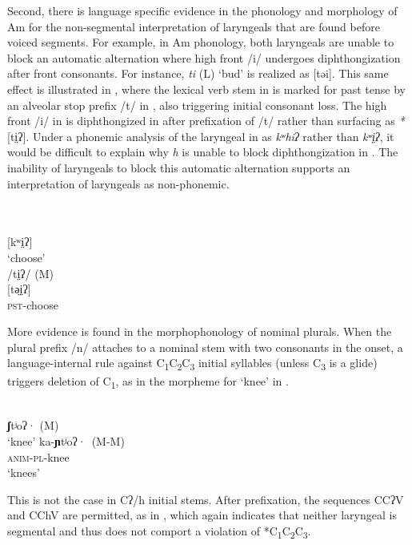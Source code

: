 \documentclass[output=paper]{langscibook}
\begin{document}
Second, there is language specific evidence in the phonology and morphology of Am for the non-segmental interpretation of laryngeals that are found before voiced segments. For example, in Am phonology, both laryngeals are unable to block an automatic alternation where high front /i/ undergoes diphthongization after front consonants. For instance, \textit{ti} (L) ‘bud’ is realized as [təi]. This same effect is illustrated in , where the lexical verb stem in  is marked for past tense by an alveolar stop prefix /t/ in , also triggering initial consonant loss. The high front /i/ in  is diphthongized in  after prefixation of /t/ rather than surfacing as \textit{*}[ti̤ʔ]. Under a phonemic analysis of the laryngeal in  as \textit{kʷ}\textit{hiʔ} rather than \textit{kʷ}\textit{i̤ʔ}, it would be difficult to explain why \textit{h} is unable to block diphthongization in . The inability of laryngeals to block this automatic alternation supports an interpretation of laryngeals as non-phonemic.

\ea\label{ex:dobui:18}
{ \citet[565]{DeJesúsGarcía2004}}\\
\ea\label{ex:dobui:18a}
\\
  {[k}{ʷ}{i̤ʔ]}\\
     ‘choose’\\
\ex\label{ex:dobui:18b}
  {/ti̤ʔ/} {(M)\\
{}[tə̤i̤ʔ]} \\
 \textsc{pst-}{choose}\\
 \z
 \z

More evidence is found in the morphophonology of nominal plurals. When the plural prefix /n/ attaches to a nominal stem with two consonants in the onset, a language-internal rule against C\textsubscript{1}C\textsubscript{2}C\textsubscript{3} initial syllables (unless C\textsubscript{3} is a glide) triggers deletion of C\textsubscript{1}, as in the morpheme for ‘knee’ in .

\ea\label{ex:dobui:19}
{ \label{bkm:Ref111916202}\citet{JP2021}}\\
\ea
  \textbf{ʃ}tʲoʔ· (M) \\
\glt ‘knee’
\ex
\gll ka-\textbf{ɲ}tʲoʔ·~(M-M)\\
     \textsc{anim}-\textsc{pl}-knee\\
\glt ‘knees’
\z
\z

This is not the case in Cʔ/h initial stems. After prefixation, the sequences CCʔV and CChV are permitted, as in , which again indicates that neither laryngeal is segmental and thus does not comport a violation of *C\textsubscript{1}C\textsubscript{2}C\textsubscript{3}.
\end{document}
